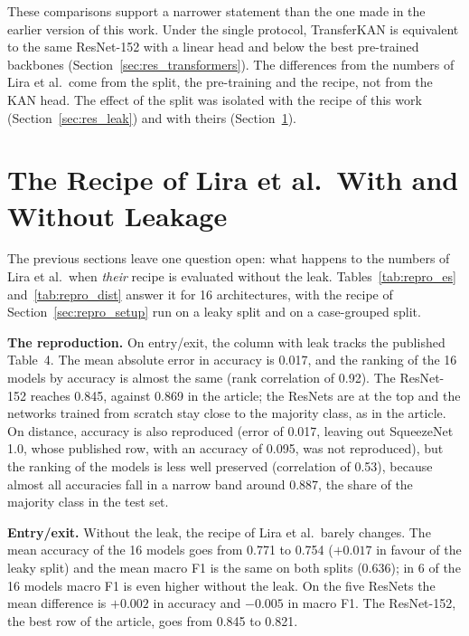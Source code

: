 These comparisons support a narrower statement than the one made in the earlier version of this work. Under the single protocol, TransferKAN is equivalent to the same ResNet-152 with a linear head and below the best pre-trained backbones (Section~\ref{sec:res_transformers}). The differences from the numbers of Lira et al.\ come from the split, the pre-training and the recipe, not from the KAN head. The effect of the split was isolated with the recipe of this work (Section~\ref{sec:res_leak}) and with theirs (Section~\ref{sec:res_repro}).

\section{The Recipe of Lira et al.\ With and Without Leakage}
\label{sec:res_repro}

The previous sections leave one question open: what happens to the numbers of Lira et al.\ when \emph{their} recipe is evaluated without the leak. Tables~\ref{tab:repro_es} and~\ref{tab:repro_dist} answer it for 16 architectures, with the recipe of Section~\ref{sec:repro_setup} run on a leaky split and on a case-grouped split.



\textbf{The reproduction.} On entry/exit, the column with leak tracks the published Table~4. The mean absolute error in accuracy is 0.017, and the ranking of the 16 models by accuracy is almost the same (rank correlation of 0.92). The ResNet-152 reaches 0.845, against 0.869 in the article; the ResNets are at the top and the networks trained from scratch stay close to the majority class, as in the article. On distance, accuracy is also reproduced (error of 0.017, leaving out SqueezeNet 1.0, whose published row, with an accuracy of 0.095, was not reproduced), but the ranking of the models is less well preserved (correlation of 0.53), because almost all accuracies fall in a narrow band around 0.887, the share of the majority class in the test set.

\textbf{Entry/exit.} Without the leak, the recipe of Lira et al.\ barely changes. The mean accuracy of the 16 models goes from 0.771 to 0.754 ($+0.017$ in favour of the leaky split) and the mean macro F1 is the same on both splits (0.636); in 6 of the 16 models macro F1 is even higher without the leak. On the five ResNets the mean difference is $+0.002$ in accuracy and $-0.005$ in macro F1. The ResNet-152, the best row of the article, goes from 0.845 to 0.821.

